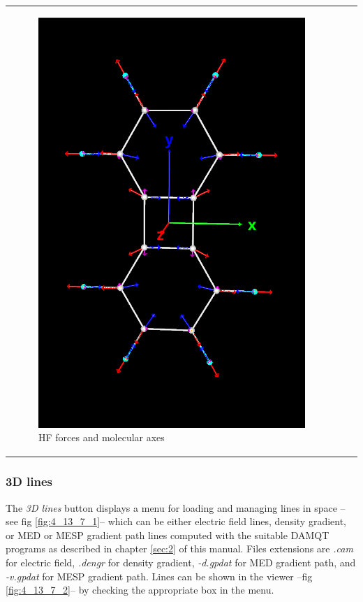 \documentclass[10pt]{article}
\begin{document}
\begin{tabular}{lcr}
\begin{minipage}{.3\linewidth}
\begin{figure}[H]
\begin{center}
            \includegraphics[width=0.8\linewidth]{damqt320_HFforces_and_axes.png}
        \end{center}
        \vspace*{4mm}
        \caption{HF forces and molecular axes \label{fig:4_13_6_2}}
    \end{figure}
\end{minipage}
\end{tabular}
\vspace*{5mm}

\subsubsection{3D lines \label{sec:4.13.7}}

The {\it 3D lines} button displays a menu for loading and managing lines in space 
--see fig \ref{fig:4_13_7_1}-- which can be either electric field lines, 
density gradient, or MED or MESP gradient path 
lines computed with the suitable DAMQT programs as described in chapter \ref{sec:2} of this manual.
Files extensions are {\it .cam} for electric field, {\it .dengr} for density gradient,
{\it -d.gpdat} for MED gradient path, and {\it -v.gpdat} for MESP gradient path.
Lines can be shown in the viewer --fig \ref{fig:4_13_7_2}-- by checking the
appropriate box in the menu.
\end{document}
